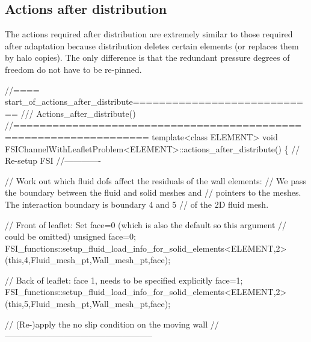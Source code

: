 



\hypertarget{index_action_after_distribution}{}\subsection{Actions after distribution}\label{index_action_after_distribution}
The actions required after distribution are extremely similar to those required after adaptation because distribution deletes certain elements (or replaces them by halo copies). The only difference is that the redundant pressure degrees of freedom do not have to be re-\/pinned.


\begin{DoxyCodeInclude}
\textcolor{comment}{//==== start\_of\_actions\_after\_distribute============================}
\textcolor{comment}{/// Actions\_after\_distribute()}
\textcolor{comment}{}\textcolor{comment}{//==================================================================}
\textcolor{keyword}{template}<\textcolor{keyword}{class} ELEMENT>
\textcolor{keywordtype}{void} FSIChannelWithLeafletProblem<ELEMENT>::actions\_after\_distribute()
\{
 \textcolor{comment}{// Re-setup FSI}
 \textcolor{comment}{//-------------}

 \textcolor{comment}{// Work out which fluid dofs affect the residuals of the wall elements:}
 \textcolor{comment}{// We pass the boundary between the fluid and solid meshes and}
 \textcolor{comment}{// pointers to the meshes. The interaction boundary is boundary 4 and 5}
 \textcolor{comment}{// of the 2D fluid mesh.}

 \textcolor{comment}{// Front of leaflet: Set face=0 (which is also the default so this argument}
 \textcolor{comment}{// could be omitted)}
 \textcolor{keywordtype}{unsigned} face=0;
 FSI\_functions::setup\_fluid\_load\_info\_for\_solid\_elements<ELEMENT,2>
  (\textcolor{keyword}{this},4,Fluid\_mesh\_pt,Wall\_mesh\_pt,face);

 \textcolor{comment}{// Back of leaflet: face 1, needs to be specified explicitly}
 face=1;
 FSI\_functions::setup\_fluid\_load\_info\_for\_solid\_elements<ELEMENT,2>
  (\textcolor{keyword}{this},5,Fluid\_mesh\_pt,Wall\_mesh\_pt,face);

 \textcolor{comment}{// (Re-)apply the no slip condition on the moving wall}
 \textcolor{comment}{//-----------------------------------------------------}


\end{DoxyCodeInclude}
